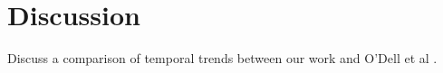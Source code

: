 \section{Discussion}

Discuss a comparison of temporal trends between our work and O'Dell et al \cite{ODell_contribution_2019}.